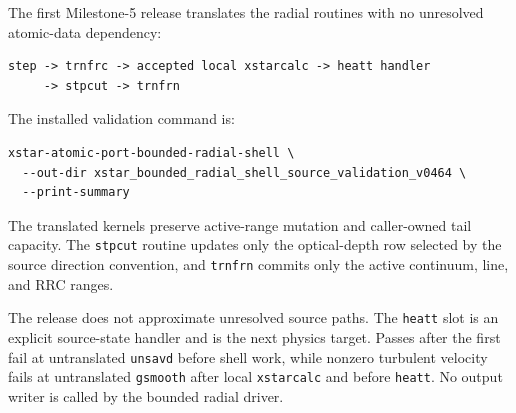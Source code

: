 \documentclass[11pt]{article}
\begin{document}
The first Milestone-5 release translates the radial routines with no unresolved
atomic-data dependency:

\begin{verbatim}
step -> trnfrc -> accepted local xstarcalc -> heatt handler
     -> stpcut -> trnfrn
\end{verbatim}

The installed validation command is:

\begin{verbatim}
xstar-atomic-port-bounded-radial-shell \
  --out-dir xstar_bounded_radial_shell_source_validation_v0464 \
  --print-summary
\end{verbatim}

The translated kernels preserve active-range mutation and caller-owned tail
capacity.  The \texttt{stpcut} routine updates only the optical-depth row
selected by the source direction convention, and \texttt{trnfrn} commits only
the active continuum, line, and RRC ranges.

The release does not approximate unresolved source paths.  The
\texttt{heatt} slot is an explicit source-state handler and is the next physics
target.  Passes after the first fail at untranslated \texttt{unsavd} before
shell work, while nonzero turbulent velocity fails at untranslated
\texttt{gsmooth} after local \texttt{xstarcalc} and before \texttt{heatt}.
No output writer is called by the bounded radial driver.
\end{document}
